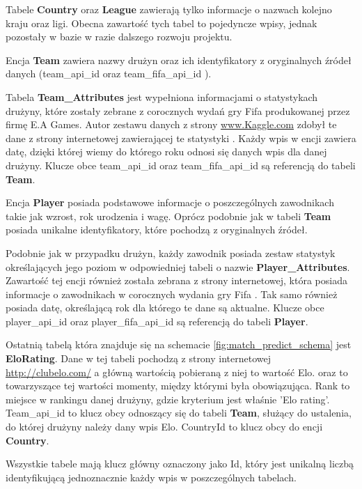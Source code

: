 Tabele \textbf{Country} oraz \textbf{League} zawierają tylko informacje o nazwach kolejno kraju oraz ligi. Obecna zawartość tych tabel to pojedyncze wpisy, jednak pozostały w bazie w razie dalszego rozwoju projektu.

Encja \textbf{Team} zawiera nazwy drużyn oraz ich identyfikatory z oryginalnych źródeł danych (team\_api\_id \cite{football_data_enetscore} oraz team\_fifa\_api\_id \cite{Sofifa}).

Tabela \textbf{Team\_Attributes} jest wypełniona informacjami o statystykach drużyny, które zostały zebrane z corocznych wydań gry Fifa produkowanej przez firmę E.A Games. Autor zestawu danych z strony \url{www.Kaggle.com} \cite{kagggle_european_soccer_database} zdobył te dane z strony internetowej zawierającej te statystyki \cite{Sofifa}. Każdy wpis w encji zawiera datę, dzięki której wiemy do którego roku odnosi się danych wpis dla danej drużyny. Klucze obce team\_api\_id oraz team\_fifa\_api\_id są referencją do tabeli \textbf{Team}.

Encja \textbf{Player} posiada podstawowe informacje o poszczególnych zawodnikach takie jak wzrost, rok urodzenia i wagę. Oprócz podobnie jak w tabeli \textbf{Team} posiada unikalne identyfikatory, które pochodzą z oryginalnych źródeł.

Podobnie jak w przypadku drużyn, każdy zawodnik posiada zestaw statystyk określających jego poziom w odpowiedniej tabeli o nazwie \textbf{Player\_Attributes}. Zawartość tej encji również została zebrana z strony internetowej, która posiada informacje o zawodnikach w corocznych wydania gry Fifa \cite{Sofifa}. Tak samo również posiada datę, określającą rok dla którego te dane są aktualne. Klucze obce player\_api\_id oraz player\_fifa\_api\_id są referencją do tabeli \textbf{Player}. 

Ostatnią tabelą która znajduje się na schemacie \ref{fig:match_predict_schema} jest \textbf{EloRating}. Dane w tej tabeli pochodzą z strony internetowej \url{http://clubelo.com/} a główną wartością pobieraną z niej to wartość Elo.  oraz  to towarzyszące tej wartości momenty, między którymi była obowiązująca. Rank to miejsce w rankingu danej drużyny, gdzie kryterium jest właśnie 'Elo rating'. Team\_api\_id to klucz obcy odnoszący się do tabeli \textbf{Team}, służący do ustalenia, do której drużyny należy dany wpis Elo. CountryId to klucz obcy do encji \textbf{Country}.

Wszystkie tabele mają klucz główny oznaczony jako Id, który jest unikalną liczbą identyfikującą jednoznacznie każdy wpis w poszczególnych tabelach.
\newpage
